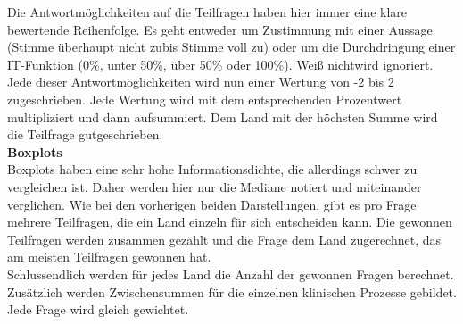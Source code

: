 	Die Antwortmöglichkeiten auf die Teilfragen haben hier immer eine klare bewertende Reihenfolge. Es geht entweder um Zustimmung mit einer Aussage (\glqq Stimme überhaupt nicht zu\grqq{ }bis \glqq Stimme voll zu\grqq) oder um die Durchdringung einer IT-Funktion (0\%, unter 50\%, über 50\% oder 100\%). \glqq Weiß nicht\grqq{ }wird ignoriert. Jede dieser Antwortmöglichkeiten wird nun einer Wertung von -2 bis 2 zugeschrieben. Jede Wertung wird mit dem entsprechenden Prozentwert multipliziert und dann aufsummiert. Dem Land mit der höchsten Summe wird die Teilfrage gutgeschrieben.
	\vspace{\parheadvspace}\\
	\textbf{Boxplots}\\
	Boxplots haben eine sehr hohe Informationsdichte, die allerdings schwer zu vergleichen ist. Daher werden hier nur die Mediane notiert und miteinander verglichen. Wie bei den vorherigen beiden Darstellungen, gibt es pro Frage mehrere Teilfragen, die ein Land einzeln für sich entscheiden kann. Die gewonnen Teilfragen werden zusammen gezählt und die Frage dem Land zugerechnet, das am meisten Teilfragen gewonnen hat.\\

	Schlussendlich werden für jedes Land die Anzahl der gewonnen Fragen berechnet. Zusätzlich werden Zwischensummen für die einzelnen klinischen Prozesse gebildet. Jede Frage wird gleich gewichtet. 

